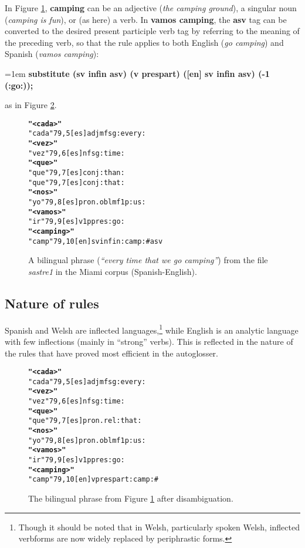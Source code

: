 \documentclass[11pt]{article}
\begin{document}
In Figure \ref{camping}, \textbf{camping} can be an adjective (\textit{the camping ground}), a singular noun (\textit{camping is fun}), or (as here) a verb.  In \textbf{vamos camping}, the \textbf{asv} tag can be converted to the desired present participle verb tag by referring to the meaning of the preceding verb, so that the rule applies to both English (\textit{go camping}) and Spanish (\textit{vamos camping}):

\noindent
\hangindent=1em
\textbf{substitute (sv infin asv) (v prespart) ([en] sv infin asv) (-1 (:go:));}

\noindent as in Figure \ref{camping1}.

\begin{figure}[!hbtp]
\centering
\begin{footnotesize}
\begin{alltt}
\normalfont
\textbf{"<cada>"}
    "cada"  {79,5} [es] adj mf sg :every:
\textbf{"<vez>"}
    "vez"  {79,6} [es] n f sg :time:
\textbf{"<que>"}
    "que"  {79,7} [es] conj :than:
    "que"  {79,7} [es] conj :that:
\textbf{"<nos>"}
    "yo"  {79,8} [es] pron.obl mf 1p :us:
\textbf{"<vamos>"}
    "ir"  {79,9} [es] v 1p pres :go:
\textbf{"<camping>"}
    "camp"  {79,10} [en] sv infin :camp: # asv
\end{alltt}
\end{footnotesize}
\caption{A bilingual phrase (\textit{``every time that we go camping''}) from the file \textit{sastre1} in the Miami corpus (Spanish-English).}
\label{camping}
\end{figure}


\subsection{Nature of rules}
\label{sec:nature}

Spanish and Welsh are inflected languages,\footnote{Though it should be noted that in Welsh, particularly spoken Welsh, inflected verbforms are now widely replaced by periphrastic forms.} while English is an analytic language with few inflections (mainly in ``strong'' verbs).  This is reflected in the nature of the rules that have proved most efficient in the autoglosser.

\begin{figure}[!hbtp]
\centering
\begin{footnotesize}
\begin{alltt}
\normalfont
\textbf{"<cada>"}
    "cada" {79,5} [es] adj mf sg :every:
\textbf{"<vez>"}
    "vez" {79,6} [es] n f sg :time:
\textbf{"<que>"}
    "que" {79,7} [es] pron.rel :that:
\textbf{"<nos>"}
    "yo" {79,8} [es] pron.obl mf 1p :us:
\textbf{"<vamos>"}
    "ir" {79,9} [es] v 1p pres :go:
\textbf{"<camping>"}
    "camp" {79,10} [en] v prespart :camp: #
\end{alltt}
\end{footnotesize}
\caption{The bilingual phrase from Figure \ref{camping} after disambiguation.}
\label{camping1}
\end{figure}
\end{document}
